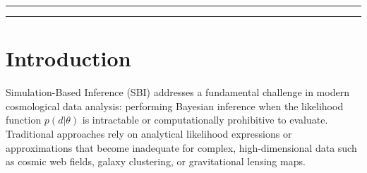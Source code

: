 \documentclass{SciPost}
\begin{document}
\noindent\textcolor{white!90!black}{%
}


\linenumbers

\vspace{10pt}
\noindent\rule{\textwidth}{1pt}
\tableofcontents
\noindent\rule{\textwidth}{1pt}
\vspace{10pt}

\section{Introduction}

Simulation-Based Inference (SBI) addresses a fundamental challenge in modern cosmological data analysis: performing Bayesian inference when the likelihood function $p(d|\theta)$ is intractable or computationally prohibitive to evaluate. Traditional approaches rely on analytical likelihood expressions or approximations that become inadequate for complex, high-dimensional data such as cosmic web fields, galaxy clustering, or gravitational lensing maps.
\end{document}
